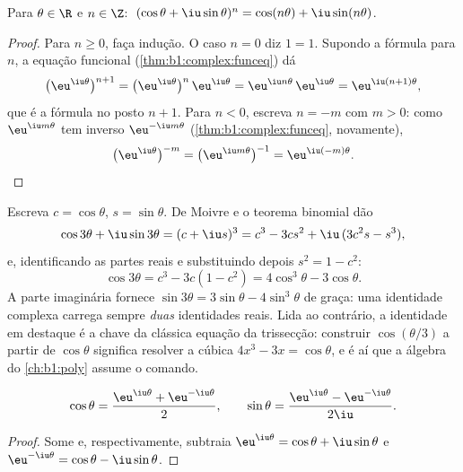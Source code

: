 \begin{corollary}\label{cor:b1:complex:demoivre}
Para $\theta \in \R$ e $n \in \Z$:
$\;(\cos\theta + \iu\sin\theta)^n = \cos(n\theta) +
\iu\sin(n\theta)$.
\end{corollary}

\begin{proof}
Para $n \geq 0$, faça indução. O caso $n = 0$ diz $1 = 1$. Supondo
a fórmula para $n$, a equação funcional
(\cref{thm:b1:complex:funceq}) dá
\[
\bigl(\eu^{\iu\theta}\bigr)^{n+1}
= \bigl(\eu^{\iu\theta}\bigr)^{n}\,\eu^{\iu\theta}
= \eu^{\iu n\theta}\,\eu^{\iu\theta}
= \eu^{\iu(n+1)\theta} ,
\]
que é a fórmula no posto $n + 1$. Para $n < 0$, escreva $n = -m$
com $m > 0$: como $\eu^{\iu m\theta}$ tem inverso
$\eu^{-\iu m\theta}$ (\cref{thm:b1:complex:funceq}, novamente),
\[
\bigl(\eu^{\iu\theta}\bigr)^{-m}
= \bigl(\eu^{\iu m\theta}\bigr)^{-1}
= \eu^{\iu(-m)\theta} . \qedhere
\]
\end{proof}

\begin{example}\label{ex:b1:complex:cos3}
Escreva $c = \cos\theta$, $s = \sin\theta$. De Moivre e o teorema
binomial dão
\[
\cos 3\theta + \iu \sin 3\theta = (c + \iu s)^3
= c^3 - 3cs^2 + \iu\,(3c^2 s - s^3),
\]
e, identificando as partes reais e substituindo depois $s^2 = 1 - c^2$:
\[
\cos 3\theta = c^3 - 3c(1 - c^2) = 4\cos^3\theta - 3\cos\theta .
\]
A parte imaginária fornece $\sin 3\theta = 3\sin\theta -
4\sin^3\theta$ de graça: uma identidade complexa carrega sempre
\emph{duas} identidades reais. Lida ao contrário, a identidade em
destaque é a chave da clássica equação da trissecção: construir
$\cos(\theta/3)$ a partir de $\cos\theta$ significa resolver a cúbica $4x^3 -
3x = \cos\theta$, e é aí que a álgebra do
\cref{ch:b1:poly} assume o comando.
\end{example}

\begin{proposition}\label{prop:b1:complex:euler}
\[
\cos\theta = \frac{\eu^{\iu\theta} + \eu^{-\iu\theta}}{2},
\qquad
\sin\theta = \frac{\eu^{\iu\theta} - \eu^{-\iu\theta}}{2\iu}.
\]
\end{proposition}

\begin{proof}
Some e, respectivamente, subtraia $\eu^{\iu\theta} = \cos\theta +
\iu\sin\theta$ e $\eu^{-\iu\theta} = \cos\theta - \iu\sin\theta$.
\end{proof}

